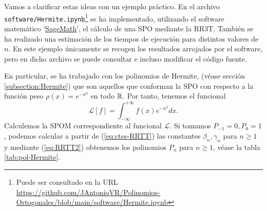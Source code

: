 \begin{ejemplo}
    \label{ej:hermite-rr3t}
    Vamos a clarificar estas ideas con un ejemplo práctico. En el archivo \texttt{software/Hermite.ipynb}\footnote{Puede ser consultado en la URL \url{https://github.com/JAntonioVR/Polinomios-Ortogonales/blob/main/software/Hermite.ipynb}} se ha implementado, utilizando el software matemático `\href{https://www.sagemath.org/}{SageMath}', el cálculo de una SPO mediante la RR3T. También se ha realizado una estimación de los tiempos de ejecución para distintos valores de $n$. En este ejemplo únicamente se recogen los resultados arrojados por el software, pero en dicho archivo se puede consultar e incluso modificar el código fuente.
    
    En particular, se ha trabajado con los polinomios de Hermite, (véase sección \ref{subsection:Hermite}) que son aquellos que conforman la SPO con respecto a la función peso $\rho(x)=e^{-x^2}$ en todo $\mathbb{R}$. Por tanto, tenemos el funcional
    $$
    \mathcal{L}[f] = \int_{-\infty}^{+\infty} f(x) e^{-x^2}dx.
    $$
    Calculemos la SPOM correspondiente al funcional $\mathcal L$. Si tomamos $P_{-1}=0, P_0=1$, podemos calcular a partir de (\ref{eq:ctes-RRTT}) las constantes $\beta_n,\gamma_n$ para $n\geq 1$ y mediante (\ref{eq:RRTT2}) obtenemos los polinomios $P_n$ para $n\geq 1$, véase la tabla \ref{tab:pol-Hermite}.


\end{ejemplo}
